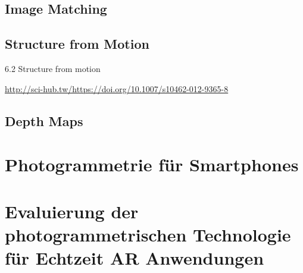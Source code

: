 \subsection{Image Matching}

\subsection{Structure from Motion}

6.2 Structure from motion

\url{http://sci-hub.tw/https://doi.org/10.1007/s10462-012-9365-8}

\subsection{Depth Maps}

\section{Photogrammetrie für Smartphones}

\section{Evaluierung der photogrammetrischen Technologie für Echtzeit AR Anwendungen}